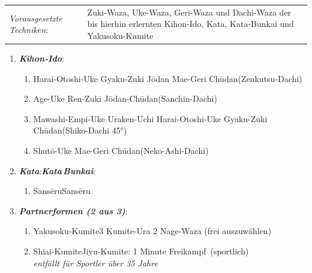 \documentclass[a5paper,landscape,DIV=calc,11pt,notitlepage]{scrartcl}
\newcommand{\bull}{\,\textbullet\,}
\begin{document}
\pagebreak
\begin{tcolorbox}[colback=white,colframe=black,coltitle=white,adjusted title=1. Dan - Schwarz - Yudansha\textit{ - \frqq Der Wegschüler\flqq}]
	\renewcommand{\labelenumi}{\alph{enumi}.)}
	\renewcommand{\labelenumii}{\arabic*.}
	{\scriptsize 
		\begin{tabularx}{\linewidth}{lX}
			\textit{Vorausgesetzte Techniken}:& Zuki-Waza, Uke-Waza, Geri-Waza und Dachi-Waza der bis hierhin erlernten Kihon-Ido, Kata, Kata-Bunkai und Yakusoku-Kumite
		\end{tabularx}}\vspace{12pt}
	\begin{enumerate}[nosep]
		\item \textit{\textbf{Kihon-Ido}}:
		\begin{enumerate}[nosep]
			\item Harai-Otoshi-Uke\bull Gyaku-Zuki J\={o}dan\bull Mae-Geri Ch\={u}dan\tabto{350pt}(Zenkutsu-Dachi)
			\item Age-Uke\bull Ren-Zuki J\={o}dan-Ch\={u}dan\tabto{350pt}(Sanchin-Dachi)
			\item Mawashi-Empi-Uke\bull Uraken-Uchi\bull Harai-Otoshi-Uke\bull Gyaku-Zuki Ch\={u}dan\tabto{350pt}(Shiko-Dachi 45°)
			\item Shut\={o}-Uke\bull Mae-Geri Ch\={u}dan\tabto{350pt}(Neko-Ashi-Dachi)
		\end{enumerate}
		\vspace{12pt}
		\item \textit{\textbf{Kata}}:\tabto{200pt}\textit{\textbf{Kata\,Bunkai}}:
		\begin{enumerate}[nosep]
			\item Sans\={e}ru\tabto{200pt}Sans\={e}ru
		\end{enumerate}
		\vspace{12pt}
		\item \textit{\textbf{Partnerformen (2 aus 3)}}:
		\begin{enumerate}[nosep]
			\item Yakusoku-Kumite\tabto{200pt}3 Kumite-Ura\bull 2 Nage-Waza (frei auszuwählen)
			\item Shiai-Kumite\tabto{200pt}Jiyu-Kumite: 1 Minute \frqq Freikampf\flqq~(sportlich)\\\tabto{200pt}\textit{entfällt für Sportler über 35 Jahre}

\end{enumerate}
\end{enumerate}
\end{tcolorbox}
\end{document}
